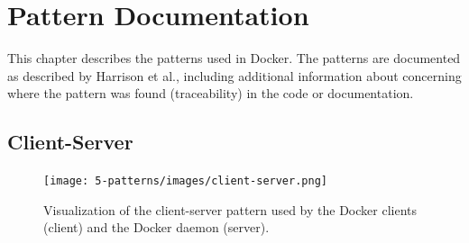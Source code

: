 
\clearpage
%
%
\setlist[description]{}

\chapter{Pattern Documentation}
\label{ch:patterns}
This chapter describes the patterns used in Docker. The patterns are documented as described by Harrison et al.\cite{usingpatternscapture}, including additional information about concerning where the pattern was found (traceability) in the code or documentation.

\section{Client-Server}
\begin{figure}[H]
\centering
\texttt{[image: 5-patterns/images/client-server.png]}
\caption{Visualization of the client-server pattern used by the Docker clients (client) and the Docker daemon (server).}
\label{fig:clientserver-pattern}
\end{figure}

